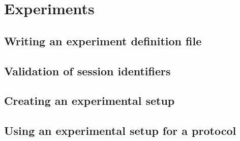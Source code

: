 \chapter{Experiments}
\label{ch:Experiments}

\section{Writing an experiment definition file}

\section{Validation of session identifiers}

\section{Creating an experimental setup}

\section{Using an experimental setup for a protocol}